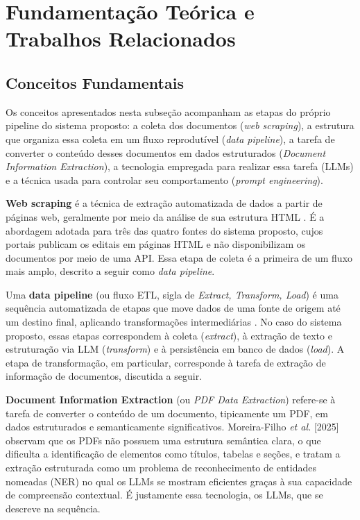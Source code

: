 \documentclass[12pt]{article}
\begin{document}
  \section{Fundamentação Teórica e Trabalhos Relacionados}\label{sec:fundamentacao-teorica-e-trabalhos-relacionados}

  \subsection{Conceitos Fundamentais}\label{sec:conceitos-fundamentais}
  Os conceitos apresentados nesta subseção acompanham as etapas do próprio pipeline do sistema proposto: a coleta dos documentos (\emph{web scraping}), a estrutura que organiza essa coleta em um fluxo reprodutível (\emph{data pipeline}), a tarefa de converter o conteúdo desses documentos em dados estruturados (\emph{Document Information Extraction}), a tecnologia empregada para realizar essa tarefa (LLMs) e a técnica usada para controlar seu comportamento (\emph{prompt engineering}).

  \textbf{Web scraping} é a técnica de extração automatizada de dados a partir de páginas web, geralmente por meio da análise de sua estrutura HTML \cite{b1}. É a abordagem adotada para três das quatro fontes do sistema proposto, cujos portais publicam os editais em páginas HTML e não disponibilizam os documentos por meio de uma API. Essa etapa de coleta é a primeira de um fluxo mais amplo, descrito a seguir como \emph{data pipeline}.

  Uma \textbf{data pipeline} (ou fluxo ETL, sigla de \emph{Extract, Transform, Load}) é uma sequência automatizada de etapas que move dados de uma fonte de origem até um destino final, aplicando transformações intermediárias \cite{b3}. No caso do sistema proposto, essas etapas correspondem à coleta (\emph{extract}), à extração de texto e estruturação via LLM (\emph{transform}) e à persistência em banco de dados (\emph{load}). A etapa de transformação, em particular, corresponde à tarefa de extração de informação de documentos, discutida a seguir.

  \textbf{Document Information Extraction} (ou \emph{PDF Data Extraction}) refere-se à tarefa de converter o conteúdo de um documento, tipicamente um PDF, em dados estruturados e semanticamente significativos. Moreira-Filho \emph{et al.} [2025] observam que os PDFs não possuem uma estrutura semântica clara, o que dificulta a identificação de elementos como títulos, tabelas e seções, e tratam a extração estruturada como um problema de reconhecimento de entidades nomeadas (NER) no qual os LLMs se mostram eficientes graças à sua capacidade de compreensão contextual. É justamente essa tecnologia, os LLMs, que se descreve na sequência.
\end{document}
